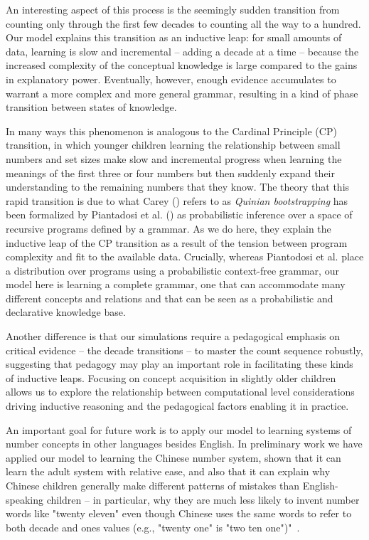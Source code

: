 \documentclass[10pt,letterpaper]{article}
\begin{document}
An interesting aspect of this process is the seemingly sudden
transition from counting only through the first few decades to
counting all the way to a hundred. Our model explains this transition
as an inductive leap: for small amounts of data, learning is slow and
incremental -- adding a decade at a time -- because the increased
complexity of the conceptual knowledge is large compared to the gains
in explanatory power. Eventually, however, enough evidence accumulates
to warrant a more complex and more general grammar, resulting
in a kind of phase transition between states of knowledge.

In many ways this phenomenon is analogous to the Cardinal Principle
(CP) transition, in which younger children learning the relationship
between small numbers and set sizes make slow and incremental progress
when learning the meanings of the first three or four numbers but then
suddenly expand their understanding to the remaining numbers that
they know. The theory that this rapid transition is due to what Carey
(\citeyear{Car2009}) refers to as \emph{Quinian bootstrapping} has
been formalized by Piantadosi et al. (\citeyear{PianGoodTen2012}) as
probabilistic inference over a space of recursive programs defined by
a grammar. As we do here, they explain the inductive leap of the CP
transition as a result of the tension between program complexity and
fit to the available data. Crucially, whereas Piantodosi et al. place
a distribution over programs using a probabilistic context-free
grammar, our model here is learning a complete grammar, one that can
accommodate many different concepts and relations and that can be seen
as a probabilistic and declarative knowledge base.

Another difference is that our simulations require a pedagogical
emphasis on critical evidence -- the decade transitions -- to master
the count sequence robustly, suggesting that pedagogy may play an
important role in facilitating these kinds of inductive leaps.
Focusing on concept acquisition in slightly older children allows us
to explore the relationship between computational level considerations
driving inductive reasoning and the pedagogical factors enabling it in
practice.

An important goal for future work is to apply our model to learning
systems of number concepts in other languages besides English.  In
preliminary work we have applied our model to learning the Chinese
number system, shown that it can learn the adult system with relative
ease, and also that it can explain why Chinese children generally make
different patterns of mistakes than English-speaking children -- in
particular, why they are much less likely to invent number words like
"twenty eleven" even though Chinese uses the same words to refer to
both decade and ones values (e.g., "twenty one" is "two ten one")"~\citep{miller1987counting}.
\end{document}
